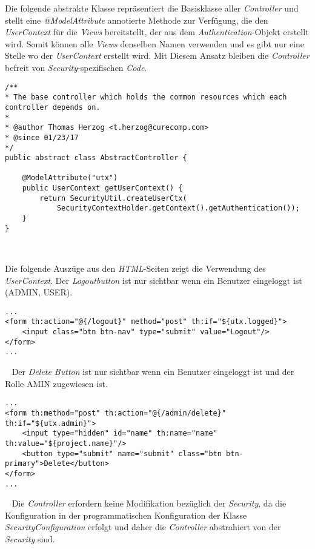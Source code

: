 Die folgende abstrakte Klasse repräsentiert die Basisklasse aller \emph{Controller} und stellt eine \emph{@ModelAttribute} annotierte Methode zur Verfügung, die den \emph{UserContext} für die \emph{Views} bereitstellt, der aus dem \emph{Authentication}-Objekt erstellt wird. Somit können alle \emph{Views} denselben Namen verwenden und es gibt nur eine Stelle wo der \emph{UserContext} erstellt wird. Mit Diesem Ansatz bleiben die \emph{Controller} befreit von \emph{Security}-spezifischen \emph{Code}.

\begin{verbatim}
/**
* The base controller which holds the common resources which each controller depends on.
*
* @author Thomas Herzog <t.herzog@curecomp.com>
* @since 01/23/17
*/
public abstract class AbstractController {
	
	@ModelAttribute("utx")
	public UserContext getUserContext() {
		return SecurityUtil.createUserCtx(
			SecurityContextHolder.getContext().getAuthentication());
	}
} 
\end{verbatim}
\ \newline

Die folgende Auszüge aus den \emph{HTML}-Seiten zeigt die Verwendung des \emph{UserContext}.
\newline
\newline
Der \emph{Logoutbutton} ist nur sichtbar wenn ein Benutzer eingeloggt ist (ADMIN, USER).
\begin{verbatim}
...
<form th:action="@{/logout}" method="post" th:if="${utx.logged}">
	<input class="btn btn-nav" type="submit" value="Logout"/>
</form>
...
\end{verbatim}
\ \newline
Der \emph{Delete Button} ist nur sichtbar wenn ein Benutzer eingeloggt ist und der Rolle AMIN zugewiesen ist.
\begin{verbatim}
...
<form th:method="post" th:action="@{/admin/delete}" th:if="${utx.admin}">
	<input type="hidden" id="name" th:name="name" th:value="${project.name}"/>
	<button type="submit" name="submit" class="btn btn-primary">Delete</button>
</form>
...
\end{verbatim}
\ \newline
Die \emph{Controller} erfordern keine Modifikation bezüglich der \emph{Security}, da die Konfiguration in der programmatischen Konfiguration der Klasse \emph{SecurityConfiguration} erfolgt und daher die \emph{Controller} abstrahiert von der \emph{Security} sind. 



